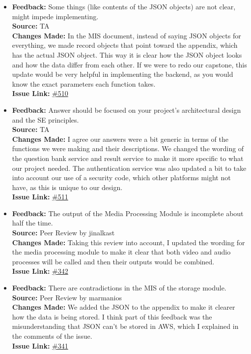 \documentclass{article}
\begin{document}
\begin{itemize}
    \item
      \textbf{Feedback:} Some things (like contents of the JSON objects) are not clear, might impede implementing. \\
      \textbf{Source:} TA \\
      \textbf{Changes Made:} In the MIS document, instead of saying JSON objects for everything, we made record objects that point toward the appendix, which has the actual JSON object. This way it is clear how the JSON object looks and how the data differ from each other. If we were to redo our capstone, this update would be very helpful in implementing the backend, as you would know the exact parameters each function takes. \\
      \textbf{Issue Link:} \href{https://github.com/parishanizam/TeleHealth/issues/510}{\#510}
    
    \item
      \textbf{Feedback:} Answer should be focused on your project’s architectural design and the SE principles. \\
      \textbf{Source:} TA \\
      \textbf{Changes Made:} I agree our answers were a bit generic in terms of the functions we were making and their descriptions. We changed the wording of the question bank service and result service to make it more specific to what our project needed. The authentication service was also updated a bit to take into account our use of a security code, which other platforms might not have, as this is unique to our design. \\
      \textbf{Issue Link:} \href{https://github.com/parishanizam/TeleHealth/issues/511}{\#511}
    
    \item 
        \textbf{Feedback:} The output of the Media Processing Module is incomplete about half the time.\\
        \textbf{Source:} Peer Review by jinalkast\\
        \textbf{Changes Made:} Taking this review into account, I updated the wording for the media processing module to make it clear that both video and audio processes will be called and then their outputs would be combined.\\
        \textbf{Issue Link:} \href{https://github.com/parishanizam/TeleHealth/issues/342}{\#342}
    
    \item 
        \textbf{Feedback:} There are contradictions in the MIS of the storage module.\\
        \textbf{Source:} Peer Review by marmanios\\
        \textbf{Changes Made:} We added the JSON to the appendix to make it clearer how the data is being stored. I think part of this feedback was the misunderstanding that JSON can’t be stored in AWS, which I explained in the comments of the issue.\\
        \textbf{Issue Link:} \href{https://github.com/parishanizam/TeleHealth/issues/341}{\#341}
    

\end{itemize}
\end{document}
